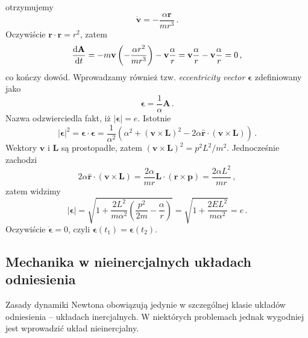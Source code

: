 \documentclass[../main.tex]{subfiles}
\begin{document}
otrzymujemy
\begin{equation*}
    \dot{\mathbf{v}}=-\frac{\alpha\mathbf{r}}{mr^3}\,.
\end{equation*}
Oczywiście \(\mathbf{r}\cdot\mathbf{r}=r^2\), zatem
\begin{equation*}
    \dv{\mathbf{A}}{t}=-m\mathbf{v}\left(-\frac{\alpha r^2}{mr^3}\right)-\mathbf{v}\frac{\alpha}{r}=\mathbf{v}\frac{\alpha}{r}-\mathbf{v}\frac{\alpha}{r}=0\,,
\end{equation*}
co kończy dowód. Wprowadzamy również tzw. \textit{eccentricity vector} \(\boldsymbol{\epsilon}\)
zdefiniowany jako
\begin{equation*}
    \boldsymbol{\epsilon}=\frac{1}{\alpha}\mathbf{A}\,.
\end{equation*}
Nazwa odzwierciedla fakt, iż \(|\boldsymbol{\epsilon}|=e\). Istotnie
\begin{equation*}
    |\boldsymbol{\epsilon}|^2=\boldsymbol{\epsilon}\cdot \boldsymbol{\epsilon}=\frac{1}{\alpha^2}\left(\alpha^2+(\mathbf{v}\times\mathbf{L})^2-2\alpha\mathbf{\hat{r}}\cdot(\mathbf{v}\times\mathbf{L})\right)\,.
\end{equation*}
Wektory \(\mathbf{v}\) i \(\mathbf{L}\) są prostopadłe, zatem
\((\mathbf{v}\times\mathbf{L})^2=p^2L^2/m^2\). Jednocześnie zachodzi
\begin{equation*}
    2\alpha\mathbf{\hat{r}}\cdot(\mathbf{v}\times\mathbf{L})=\frac{2\alpha}{mr}\mathbf{L}\cdot(\mathbf{r}\times \mathbf{p})=\frac{2\alpha L^2}{mr}\,,
\end{equation*}
zatem widzimy
\begin{equation*}
    |\boldsymbol{\epsilon}|=\sqrt{1+\frac{2L^2}{m\alpha^2}\left(\frac{p^2}{2m}-\frac{\alpha}{r}\right)}=\sqrt{1+\frac{2EL^2}{m\alpha^2}}=e\,.
\end{equation*}
Oczywiście \(\dot{\boldsymbol{\epsilon}}=0\), czyli
\(\boldsymbol{\epsilon}(t_1)=\boldsymbol{\epsilon}(t_2)\).

\subsection{Mechanika w nieinercjalnych układach odniesienia}
Zasady dynamiki Newtona obowiązują jedynie w szczególnej klasie układów odniesienia -- układach
inercjalnych. W niektórych problemach jednak wygodniej jest wprowadzić układ nieinercjalny.
\end{document}
